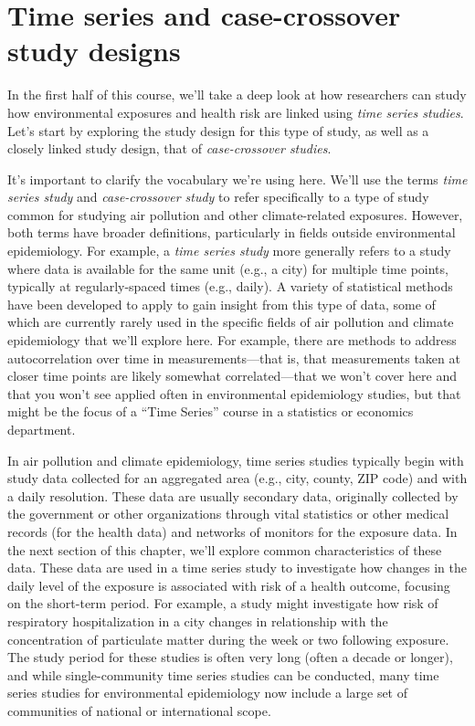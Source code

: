 \documentclass[
]{book}
\begin{document}
\hypertarget{time-series-and-case-crossover-study-designs}{%
\section{Time series and case-crossover study designs}\label{time-series-and-case-crossover-study-designs}}

In the first half of this course, we'll take a deep look at how researchers
can study how environmental exposures and health risk are linked using
\emph{time series studies}. Let's start by exploring the study design for this type
of study, as well as a closely linked study design, that of \emph{case-crossover
studies}.

It's important to clarify the vocabulary we're using here. We'll use the terms
\emph{time series study} and \emph{case-crossover study} to refer specifically to a type
of study common for studying air pollution and other climate-related exposures.
However, both terms have broader definitions, particularly in fields outside
environmental epidemiology. For example, a \emph{time series study} more generally
refers to a study where data is available for the same unit (e.g., a city)
for multiple time points, typically at regularly-spaced times (e.g., daily).
A variety of statistical methods have been developed to apply to gain insight
from this type of data, some of which are currently rarely used in the specific
fields of air pollution and climate epidemiology that we'll explore here. For
example, there are methods to address autocorrelation over time in
measurements---that is, that measurements taken at closer time points are likely
somewhat correlated---that we won't cover here and that you won't see applied
often in environmental epidemiology studies, but that might be the focus of
a ``Time Series'' course in a statistics or economics department.

In air pollution and climate epidemiology, time series studies typically begin
with study data collected for an aggregated area (e.g., city, county, ZIP code)
and with a daily resolution. These data are usually secondary data, originally
collected by the government or other organizations through vital statistics
or other medical records (for the health data) and networks of monitors for
the exposure data. In the next section of this chapter, we'll explore common
characteristics of these data. These data are used in a time series study to
investigate how changes in the daily level of the exposure is associated with
risk of a health outcome, focusing on the short-term period. For example, a
study might investigate how risk of respiratory hospitalization in a city
changes in relationship with the concentration of particulate matter during the
week or two following exposure. The study period for these studies is often
very long (often a decade or longer), and while single-community time series
studies can be conducted, many time series studies for environmental epidemiology
now include a large set of communities of national or international scope.
\end{document}
